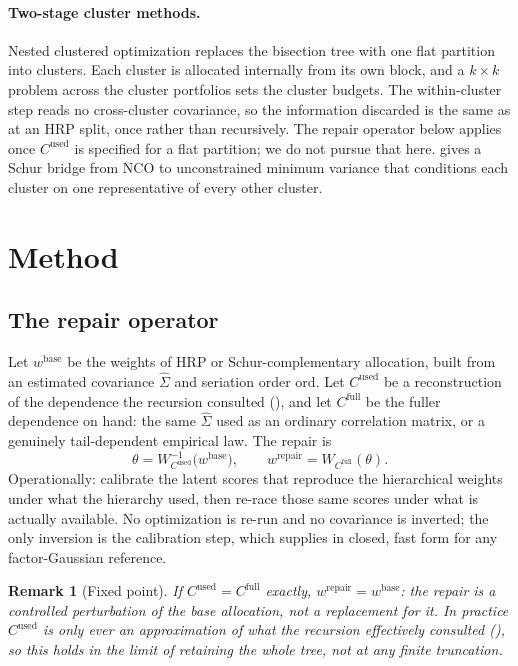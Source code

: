 \documentclass[11pt]{article}
\newtheorem{remark}{Remark}
\begin{document}
\paragraph{Two-stage cluster methods.} Nested clustered optimization
\parencite{lopezdeprado2020} replaces the bisection tree with one flat
partition into clusters. Each cluster is allocated internally from its own
block, and a $k\times k$ problem across the cluster portfolios sets the
cluster budgets. The within-cluster step reads no cross-cluster covariance,
so the information discarded is the same as at an HRP split, once rather
than recursively. The repair operator below applies once
$C^{\mathrm{used}}$ is specified for a flat partition; we do not pursue
that here. \textcite{cotton2026ncobridge} gives a Schur bridge from NCO to
unconstrained minimum variance that conditions each cluster on one
representative of every other cluster.

\section{Method}
\label{sec:method}

\subsection{The repair operator}

Let $w^{\mathrm{base}}$ be the weights of HRP or Schur-complementary
allocation, built from an estimated covariance $\hat\Sigma$ and seriation
order $\mathrm{ord}$. Let $C^{\mathrm{used}}$ be a reconstruction of the
dependence the recursion consulted (), and let
$C^{\mathrm{full}}$ be the fuller dependence on hand: the same $\hat\Sigma$
used as an ordinary correlation matrix, or a genuinely tail-dependent
empirical law. The repair is
\[
  \theta = W_{C^{\mathrm{used}}}^{-1}\big(w^{\mathrm{base}}\big), \qquad
  w^{\mathrm{repair}} = W_{C^{\mathrm{full}}}(\theta).
\]
Operationally: calibrate the latent scores that reproduce the hierarchical
weights under what the hierarchy used, then re-race those same scores under
what is actually available. No optimization is re-run and no covariance is
inverted; the only inversion is the calibration step, which
\textcite{cotton2026factorprobit} supplies in closed, fast form for any
factor-Gaussian reference.

\begin{remark}[Fixed point]
If $C^{\mathrm{used}}=C^{\mathrm{full}}$ exactly, $w^{\mathrm{repair}}=w^{\mathrm{base}}$: the
repair is a controlled perturbation of the base allocation, not a
replacement for it. In practice $C^{\mathrm{used}}$ is only ever an
approximation of what the recursion effectively consulted
(), so this holds in the limit of retaining the whole tree,
not at any finite truncation.
\end{remark}
\end{document}
